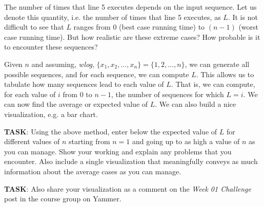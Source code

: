 \documentclass[a4paper]{exam}
\begin{document}
\begin{questions}
  The number of times that line 5 executes depends on the input sequence. Let us denote this quantity, i.e. the number of times that line 5 executes, as $L$. It is not difficult to see that $L$ ranges from $0$ (best case running time) to $(n-1)$ (worst case running time). But how realistic are these extreme cases? How probable is it to encounter these sequences?

  Given $n$ and assuming, \textit{wlog}, $\{x_1,x_2,\ldots,x_n\} = \{1,2,\ldots,n\}$, we can generate all possible sequences, and for each sequence, we can compute $L$. This allows us to tabulate how many sequences lead to each value of $L$. That is, we can compute, for each value of $i$ from $0$ to $n-1$, the number of sequences for which $L=i$. We can now find the average or expected value of $L$. We can also build a nice visualization, e.g. a bar chart.

\noindent\textbf{TASK}:  Using the above method, enter below the expected value of $L$ for different values of $n$ starting from $n=1$ and going up to as high a value of $n$ as you can manage. Show your working and explain any problems that you encounter. Also include a single visualization that meaningfully conveys as much information about the average cases as you can manage.

\noindent\textbf{TASK}:  Also share your visualization as a comment on the \textit{Week 01 Challenge} post in the course group on Yammer.

  \begin{solution}
  \end{solution}


\end{questions}
\end{document}
